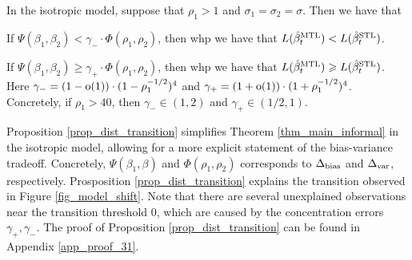 \begin{proposition}\label{prop_dist_transition}
	In the isotropic model, suppose that $\rho_1 > 1$ and $\sigma_1 = \sigma_2 = \sigma$.
	Then we have that
	\squishlist
		\item If $\Psi(\beta_1, \beta_2) < \gamma_{-} \cdot \Phi(\rho_1, \rho_2)$, then whp we have that $L(\hat{\beta}_t^{\text{MTL}}) < L(\hat{\beta}_t^{\text{STL}})$.
		\item If $\Psi(\beta_1, \beta_2) \ge \gamma_{+} \cdot \Phi(\rho_1, \rho_2)$, then whp we have that $L(\hat{\beta}_t^{\text{MTL}}) \geqslant L(\hat{\beta}_t^{\text{STL}})$.
	\squishend
	Here $\gamma_{-} = (1-\operatorname{o}(1))\cdot(1 - \rho_1^{-1/2})^4$ and $\gamma_{+} = (1+\operatorname{o}(1))\cdot(1 + \rho_1^{-1/2})^4$.
	Concretely, if $\rho_1 > 40$, then $\gamma_{-} \in (1,2)$ and $\gamma_{+} \in (1/2, 1)$.
\end{proposition}

Proposition \ref{prop_dist_transition} simplifies Theorem \ref{thm_main_informal} in the isotropic model, allowing for a more explicit statement of the bias-variance tradeoff.
Concretely, $\Psi(\beta_1, \beta)$ and $\Phi(\rho_1, \rho_2)$ corresponds to $\Delta_{\text{bias}}$ and $\Delta_{\text{var}}$, respectively.
Prosposition \ref{prop_dist_transition} explains the transition observed in Figure \ref{fig_model_shift}.
Note that there are several unexplained observations near the transition threshold $0$, which are caused by the concentration errors $\gamma_+, \gamma_-$.
The proof of Proposition \ref{prop_dist_transition} can be found in Appendix \ref{app_proof_31}. %

